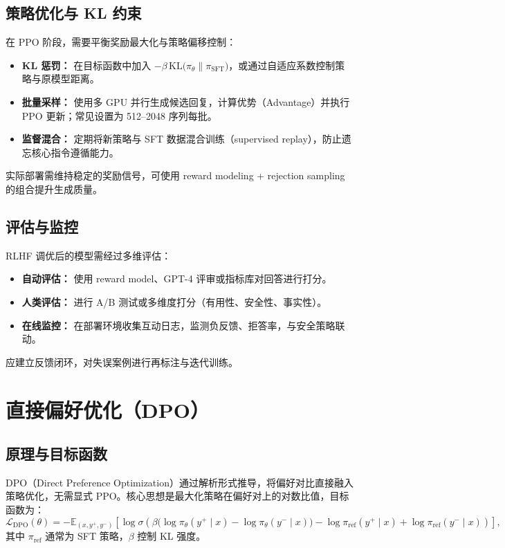 \documentclass[UTF8,zihao=-4]{ctexart}
\begin{document}
\subsection{策略优化与 KL 约束}
在 PPO 阶段，需要平衡奖励最大化与策略偏移控制：
\begin{itemize}
  \item \textbf{KL 惩罚：} 在目标函数中加入 $-\beta \, \mathrm{KL}\big(\pi_\theta \| \pi_{\text{SFT}}\big)$，或通过自适应系数控制策略与原模型距离。
  \item \textbf{批量采样：} 使用多 GPU 并行生成候选回复，计算优势（Advantage）并执行 PPO 更新；常见设置为 512--2048 序列每批。
  \item \textbf{监督混合：} 定期将新策略与 SFT 数据混合训练（supervised replay），防止遗忘核心指令遵循能力。
\end{itemize}
实际部署需维持稳定的奖励信号，可使用 reward modeling + rejection sampling 的组合提升生成质量。

\subsection{评估与监控}
RLHF 调优后的模型需经过多维评估：
\begin{itemize}
  \item \textbf{自动评估：} 使用 reward model、GPT-4 评审或指标库对回答进行打分。
  \item \textbf{人类评估：} 进行 A/B 测试或多维度打分（有用性、安全性、事实性）。
  \item \textbf{在线监控：} 在部署环境收集互动日志，监测负反馈、拒答率，与安全策略联动。
\end{itemize}
应建立反馈闭环，对失误案例进行再标注与迭代训练。

\section{直接偏好优化（DPO）}
\subsection{原理与目标函数}
DPO（Direct Preference Optimization）通过解析形式推导，将偏好对比直接融入策略优化，无需显式 PPO。核心思想是最大化策略在偏好对上的对数比值，目标函数为：
\begin{equation}
  \mathcal{L}_{\text{DPO}}(\theta) = - \mathbb{E}_{(x, y^+, y^-)} \left[ \log \sigma\left(\beta \big(\log \pi_\theta(y^+ \mid x) - \log \pi_\theta(y^- \mid x)\big) - \log \pi_{\text{ref}}(y^+ \mid x) + \log \pi_{\text{ref}}(y^- \mid x)\right) \right],
\end{equation}
其中 $\pi_{\text{ref}}$ 通常为 SFT 策略，$\beta$ 控制 KL 强度。
\end{document}
